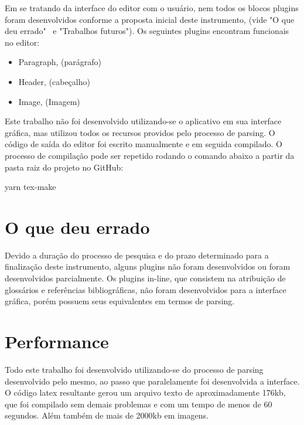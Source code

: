 Em se tratando da interface do editor com o usuário, nem todos os blocos plugins foram desenvolvidos
conforme a proposta inicial deste instrumento, (vide "O que deu errado"~ e "Trabalhos futuros").
Os seguintes plugins encontram funcionais no editor:

\begin{itemize}
        
	\item Paragraph, (parágrafo)
	\item Header, (cabeçalho)
	\item Image, (Imagem)
    
\end{itemize}

Este trabalho não foi desenvolvido utilizando-se o aplicativo em sua interface gráfica, mas utilizou todos os recursos providos pelo processo de parsing. O código de saída do editor foi escrito manualmente e em seguida compilado. O processo de compilação pode ser repetido rodando o comando abaixo a partir da pasta raiz do projeto no GitHub:

\begin{Code73c00f5bd5584eb4b4a1f1de6b70549c}
yarn tex-make
\end{Code73c00f5bd5584eb4b4a1f1de6b70549c}

\section{O que deu errado}

Devido a duração do processo de pesquisa e do prazo determinado para a finalização deste instrumento,
alguns plugins não foram desenvolvidos ou foram desenvolvidos parcialmente. Os plugins in-line, que consistem
na atribuição de glossários e referências bibliográficas, não foram desenvolvidos para a interface gráfica,
porém possuem seus equivalentes em termos de parsing.

\section{Performance}

Todo este trabalho foi desenvolvido utilizando-se do processo de parsing desenvolvido pelo mesmo, ao passo que
paralelamente foi desenvolvida a interface.
O código
\acrshort{latex}
resultante gerou um arquivo texto de aproximadamente 176kb, que foi compilado sem demais problemas
e com um tempo de menos de 60 segundos. Além também de mais de 2000kb em imagens.

